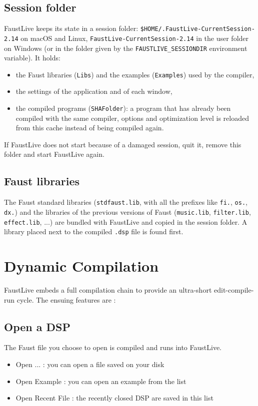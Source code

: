 \documentclass[a4paper]{article}
\begin{document}
\subsection{Session folder}
FaustLive keeps its state in a session folder: \texttt{\$HOME/.FaustLive-CurrentSession-2.14} on macOS and Linux, \texttt{FaustLive-CurrentSession-2.14} in the user folder on Windows (or in the folder given by the \texttt{FAUSTLIVE\_SESSIONDIR} environment variable). It holds:
\begin{itemize}
\item the Faust libraries (\texttt{Libs}) and the examples (\texttt{Examples}) used by the compiler,
\item the settings of the application and of each window,
\item the compiled programs (\texttt{SHAFolder}): a program that has already been compiled with the same compiler, options and optimization level is reloaded from this cache instead of being compiled again.
\end{itemize}
If FaustLive does not start because of a damaged session, quit it, remove this folder and start FaustLive again.

\subsection{Faust libraries}
The Faust standard libraries (\texttt{stdfaust.lib}, with all the prefixes like \texttt{fi.}, \texttt{os.}, \texttt{dx.}) and the libraries of the previous versions of Faust (\texttt{music.lib}, \texttt{filter.lib}, \texttt{effect.lib}, ...) are bundled with FaustLive and copied in the session folder. A library placed next to the compiled \texttt{.dsp} file is found first.

\section{Dynamic Compilation}
FaustLive embeds a full compilation chain to provide an ultra-short edit-compile-run cycle.
The ensuing features are :

\subsection{Open a DSP}
The Faust file you choose to open is compiled and runs into FaustLive.
\begin{itemize}
\item Open ... : you can open a file saved on your disk
\item Open Example : you can open an example from the list
\item Open Recent File : the recently closed DSP are saved in this list
\end{itemize}
\end{document}
